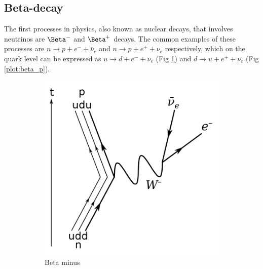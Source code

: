 \subsection{Beta-decay}

The first processes in physics, also known as nuclear decays, that involves neutrinos are $\Beta^{-}$ and  $\Beta^{+}$ decays.
The common examples of these processes are $n \rightarrow p + e^{-}+\bar{\nu}_e$ and $n \rightarrow p + e^{+}+\nu_e$ respectively, which on the quark level can be expressed as $u \rightarrow d + e^{-}+\bar{\nu_e}$ (Fig \ref{plot:beta_m}) and $d \rightarrow u + e^{+}+\nu_e$ (Fig \ref{plot:beta_p}).

\begin{figure}[H]
\centering
\begin{subfigure}[b]{0.35\textwidth}
    \centering
    \includegraphics[width=\linewidth]{figures/chapter6/768px-Beta_Negative_Decay.svg.png}
\caption{Beta minus}
    \label{plot:beta_m}
  \end{subfigure}
\begin{subfigure}[b]{0.35\textwidth}
    \centering

\end{subfigure}
\end{figure}
